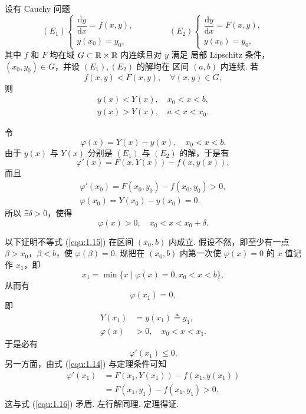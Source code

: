 \begin{thm}[(第一比较定理)]
设有 Cauchy 问题
\[
(E_1)
\begin{cases}
    \dfrac{\mathrm{d}y}{\mathrm{d}x} = f(x, y), \\[10pt]
    y(x_0) = y_0,
\end{cases}
\qquad\qquad
(E_2)
\begin{cases}
    \dfrac{\mathrm{d}y}{\mathrm{d}x} = F(x, y), \\[10pt]
    y(x_0) = y_0,
\end{cases}
\]
其中 $f$ 和 $F$ 均在域 $G\subset \mathbb{R}\times\mathbb{R}$ 内连续且对 $y$ 满足
局部 Lipschitz 条件，$(x_0,y_0)\in G$，并设 $(E_1),(E_2)$ 的解均在
区间 $(a,b)$ 内连续. 若
\begin{equation}
f(x,y)<F(x,y),\quad\forall (x,y)\in G, 
\end{equation}
则
\begin{equation}
\begin{array}{c}
y(x)<Y(x),\quad x_0<x<b,\\
y(x)>Y(x),\quad a<x<x_0.
\end{array}
\end{equation}
\end{thm}
\begin{pf1}
令
\[
\varphi(x)=Y(x)-y(x),\quad x_0<x<b.
\]
由于 \(y(x)\) 与 \(Y(x)\) 分别是 \((E_1)\) 与 \((E_2)\) 的解，于是有
\begin{equation}\label{equ:1.14}
    \varphi'(x) = F(x, Y(x)) - f(x, y(x)),
\end{equation}
而且
\[
\begin{gathered}
    \varphi'(x_0) = F(x_0, y_0) - f(x_0, y_0) > 0, \\
    \varphi(x_0) = Y(x_0) - y(x_0) = 0.
\end{gathered}
\]
所以 \(\exists \delta > 0\)，使得
\begin{equation}\label{equ:1.15}
    \varphi(x) > 0, \quad x_0 < x < x_0 + \delta.
\end{equation}

以下证明不等式 (\ref{equ:1.15}) 在区间 \((x_0, b)\) 内成立. 假设不然，即至少有一点 \(\beta > x_0\)，\(\beta < b\)，使 \(\varphi(\beta) = 0\). 现把在 \((x_0, b)\) 内第一次使 \(\varphi(x) = 0\) 的 \(x\) 值记作 \(x_1\)，即
\[
    x_1 = \min\{x \mid \varphi(x) = 0, x_0 < x < b\},
\]
从而有
\[
    \varphi(x_1) = 0,
\]
即
\[
\begin{aligned}
    Y(x_1) &= y(x_1) \triangleq y_1, \\
    \varphi(x) &> 0, \quad x_0 < x < x_1.
\end{aligned}
\]
于是必有
\begin{equation}\label{equ:1.16}
    \varphi'(x_1) \leqslant 0.
\end{equation}
另一方面，由式 (\ref{equ:1.14}) 与定理条件可知
\[
\begin{aligned}
    \varphi'(x_1) &= F(x_1, Y(x_1)) - f(x_1, y(x_1)) \\
    &= F(x_1, y_1) - f(x_1, y_1) > 0,
\end{aligned}
\]
这与式 (\ref{equ:1.16}) 矛盾. 左行解同理. 定理得证.
\end{pf1}

